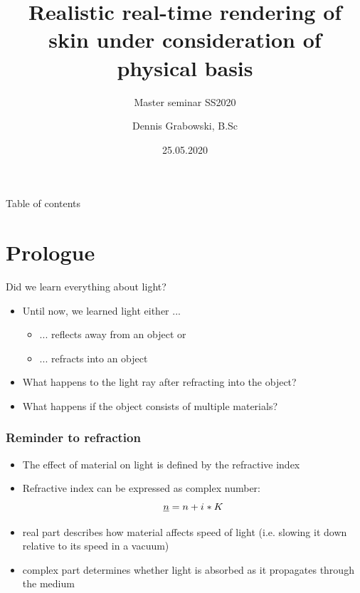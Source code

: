 \documentclass{f4_beamer_metropolis}
\title{Realistic real-time rendering of skin under consideration of physical basis}
\subtitle{Master seminar SS2020}
\author{Dennis Grabowski, B.Sc}
\date{25.05.2020}
\newcommand{\iu}{{i\mkern1mu}}
\begin{document}
\begin{frame}[t]{Table of contents}
    \tableofcontents[hideallsubsections]
  \end{frame}

\section{Prologue}
\label{sec:intro}

\begin{frame}[t]{Did we learn everything about light?}
  \begin{itemize}
    \item Until now, we learned light either ...
    \begin{itemize}
      \item ... reflects away from an object or
      \item ... refracts into an object
    \end{itemize}
    \item What happens to the light ray after refracting into the object?
    \item What happens if the object consists of multiple materials?

  \end{itemize}
\end{frame}

\begin{frame}[t]
  \frametitle{Reminder to refraction}
  \begin{itemize}
    \item The effect of material on light is defined by the refractive index
    \item Refractive index can be expressed as complex number: $$ \underline{n} = n + \iu * K$$
    \item real part describes how material affects speed of light (i.e. slowing it down relative to its speed in a vacuum)
    \item complex part determines whether light is absorbed as it propagates through the medium
  \end{itemize}
\end{frame}
\end{document}
